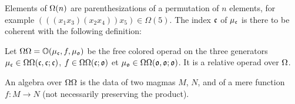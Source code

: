Elements of $\Omega(n)$ are parenthesizations of a permutation of $n$ elements, for example $(((x_{1}x_{3})(x_{2}x_{4}))x_{5}) \in \Omega(5)$.
The index $\mathfrak{c}$ of $\mu_{\mathfrak{c}}$ is there to be coherent with the following definition:

\begin{definition}
  Let ${\Omega\Omega} = \mathbb{O}(\mu_{\mathfrak{c}}, f, \mu_{\mathfrak{o}})$ be the free colored operad on the three generators $\mu_{\mathfrak{c}} \in {\Omega\Omega}(\mathfrak{c}, \mathfrak{c}; \mathfrak{c})$, $f \in {\Omega\Omega}(\mathfrak{c}; \mathfrak{o})$ et $\mu_{\mathfrak{o}} \in {\Omega\Omega}(\mathfrak{o}, \mathfrak{o}; \mathfrak{o})$.
  It is a relative operad over $\Omega$.
\end{definition}
An algebra over ${\Omega\Omega}$ is the data of two magmas $M$, $N$, and of a mere function $f : M \to N$ (not necessarily preserving the product).

